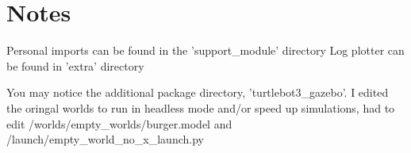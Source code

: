 \documentclass{article}
\begin{document}
    \pagebreak
    \section*{Notes}
    Personal imports can be found in the 'support\_module' directory \break
    Log plotter can be found in 'extra' directory \break

    You may notice the additional package directory, 'turtlebot3\_gazebo'. I edited the oringal worlds to run in headless mode and/or speed up simulations, had to edit /worlds/empty\_worlds/burger.model and /launch/empty\_world\_no\_x\_launch.py
\end{document}
